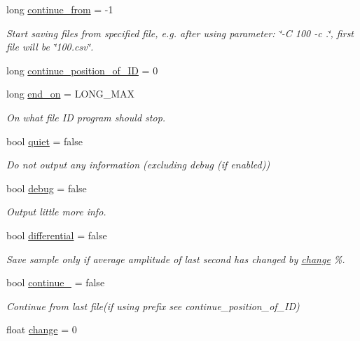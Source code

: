 \begin{DoxyCompactItemize}
long \hyperlink{class_settings_a1ff22226652e146e1511d9d17deefa1f}{continue\+\_\+from} = -\/1
\begin{DoxyCompactList}\small\item\em Start saving files from specified file, e.\+g. after using parameter\+: \char`\"{}-\/\+C 100 -\/c .\char`\"{}, first file will be \char`\"{}100.\+csv\char`\"{}. \end{DoxyCompactList}\item 
long \hyperlink{class_settings_a3941f843caf6ffd81172cb42de2d0907}{continue\+\_\+position\+\_\+of\+\_\+\+ID} = 0
\item 
long \hyperlink{class_settings_ab9379f5abb4c1ab32f5b04638c5249a5}{end\+\_\+on} = L\+O\+N\+G\+\_\+\+M\+AX
\begin{DoxyCompactList}\small\item\em On what file ID program should stop. \end{DoxyCompactList}\item 
bool \hyperlink{class_settings_a1c533c67c68ec619c34adbf2ae70bfb6}{quiet} = false
\begin{DoxyCompactList}\small\item\em Do not output any information (excluding debug (if enabled)) \end{DoxyCompactList}\item 
bool \hyperlink{class_settings_ad9ae775f5f68995dd70b263ff006d5dd}{debug} = false
\begin{DoxyCompactList}\small\item\em Output little more info. \end{DoxyCompactList}\item 
bool \hyperlink{class_settings_a107556b8673e33e63d1310a73ed4aee7}{differential} = false
\begin{DoxyCompactList}\small\item\em Save sample only if average amplitude of last second has changed by \hyperlink{class_settings_a139c6c8d809e18fec0b3aae2b6286baa}{change} \%. \end{DoxyCompactList}\item 
bool \hyperlink{class_settings_a9ba1ae6d93fad667c597fff4e723025b}{continue\+\_\+} = false
\begin{DoxyCompactList}\small\item\em Continue from last file(if using prefix see continue\+\_\+position\+\_\+of\+\_\+\+I\+D) \end{DoxyCompactList}\item 
float \hyperlink{class_settings_a139c6c8d809e18fec0b3aae2b6286baa}{change} = 0

\end{DoxyCompactItemize}
